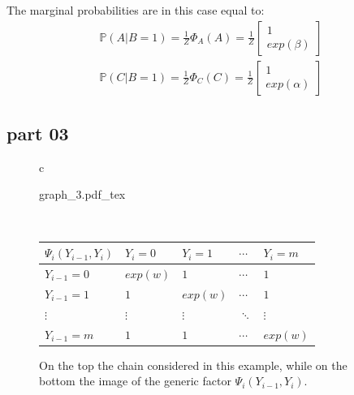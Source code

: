 The marginal probabilities are in this case equal to:
\begin{eqnarray}
\mathbb{P}(A | B = 1) = \frac{1}{Z}  \Phi_A(A) = \frac{1}{Z}  \begin{bmatrix} 1 \\ exp(\beta)  \end{bmatrix} \\
\mathbb{P}(C | B = 1) = \frac{1}{Z}  \Phi_C(C) = \frac{1}{Z}  \begin{bmatrix} 1 \\ exp(\alpha)  \end{bmatrix} 
\end{eqnarray}


\subsection{part 03}

\begin{figure}
\begin{tabular}{c}
\begin{minipage}[t]{0.8 \columnwidth}
	\centering
\def\svgwidth{0.9 \textwidth}
{graph_3.pdf_tex} 
\end{minipage} 
 \\ 
\begin{minipage}[t]{0.39 \columnwidth}
	\centering
\begin{tabular}{l|l|l|l|l|}
 $\Psi_i(Y_{i-1}, Y_i)$ & $Y_i = 0$ & $Y_i = 1$ & $\cdots$ & $Y_i = m$ \\
      \hline
$Y_{i-1} = 0$ 		  & $exp(w)$& $1$     & $\cdots$     & $1$     \\
\hline
$Y_{i-1} = 1$ 		  & $1$     & $exp(w)$& $\cdots$     & $1$    \\
\hline
$\vdots$ 		  		  & $\vdots$     & $\vdots$     & $\ddots$ & $\vdots$   \\
\hline
$Y_{i-1} = m$ 		  & $1$     & $1$     & $\cdots$ & $exp(w)$   \\
\hline 
\end{tabular}
\end{minipage} 
\end{tabular}
\caption{On the top the chain considered in this example, while on the bottom the image of the generic factor $\Psi_i(Y_{i-1}, Y_i)$.}
\label{fig:sample_02:5}
\end{figure}


